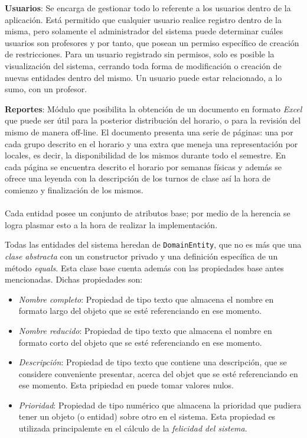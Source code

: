 \textbf{Usuarios}: Se encarga de gestionar todo lo referente a los usuarios dentro de la aplicación. Está permitido que cualquier usuario realice registro dentro de la misma, pero solamente el administrador del sistema puede determinar cuáles usuarios son profesores y por tanto, que posean un permiso específico de creación de restricciones. Para un usuario registrado sin permisos, solo es posible la visualización del sistema, cerrando toda forma de modificación o creación de nuevas entidades dentro del mismo. Un usuario puede estar relacionado, a lo sumo, con un profesor. 

\textbf{Reportes}: Módulo que posibilita la obtención de un documento en formato \textit{Excel} que puede ser útil para la posterior distribución del horario, o para la revisión del mismo de manera off-line. El documento presenta una serie de páginas: una por cada grupo descrito en el horario y una extra que meneja una representación por locales, es decir, la disponibilidad de los mismos durante todo el semestre. En cada página se encuentra descrito el horario por semanas físicas y además se ofrece una leyenda con la descripción de los turnos de clase así la hora de comienzo y finalización de los mismos.\\\\


Cada entidad posee un conjunto de atributos base; por medio de la herencia se logra plasmar esto a la hora de realizar la implementación. 

Todas las entidades del sistema heredan de \texttt{DomainEntity}, que no es más que una \textit{clase abstracta} con un constructor privado y una definición específica de un método \textit{equals}. Esta clase base cuenta además con las propiedades base antes mencionadas. Dichas propiedades son:

\label{props:base}
\begin{itemize}
	\item \textsl{Nombre completo}: Propiedad de tipo texto que almacena el nombre en formato largo del objeto que se esté referenciando en ese momento. 
	\item \textsl{Nombre reducido}: Propiedad de tipo texto que almacena el nombre en formato corto del objeto que se esté referenciando en ese momento. 
	\item \textsl{Descripción}: Propiedad de tipo texto que contiene una descripción, que se considere conveniente presentar, acerca del objet que se esté referenciando en ese momento. Esta pripiedad en puede tomar valores nulos.
	\item \textsl{Prioridad}: Propiedad de tipo numérico que almacena la prioridad que pudiera tener un objeto (o entidad) sobre otro en el sistema. Esta propiedad es utilizada principalemte en el cálculo de la \textit{felicidad del sistema}.

\end{itemize}



